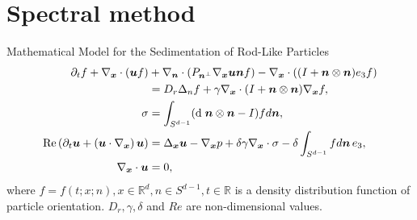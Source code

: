 \section{Spectral method}
\begin{frame}{Mathematical Model for the Sedimentation of Rod-Like Particles \cite{zbMATH06724175}}
	\scriptsize
	\begin{align*}
		\partial_t f+\nabla_{\boldsymbol{x}} \cdot(\boldsymbol{u} f) & +\nabla_{\boldsymbol{n}} \cdot\left(P_{\boldsymbol{n}^{\perp}} \nabla_{\boldsymbol{x}} \boldsymbol{u} \boldsymbol{n} f\right)-\nabla_{\boldsymbol{x}} \cdot\left((I+\boldsymbol{n} \otimes \boldsymbol{n}) e_3 f\right) \\
		& =D_r \Delta_n f+\gamma \nabla_{\boldsymbol{x}} \cdot(I+\boldsymbol{n} \otimes \boldsymbol{n}) \nabla_{\boldsymbol{x}} f, \notag \\
		\sigma & =\int_{S^{d-1}}(\text{d} \; \boldsymbol{n} \otimes \boldsymbol{n}-I) f d \boldsymbol{n},  \\
		\operatorname{Re}\left(\partial_t \boldsymbol{u}+\left(\boldsymbol{u} \cdot \nabla_{\boldsymbol{x}}\right) \boldsymbol{u}\right) & =\Delta_{\boldsymbol{x}} \boldsymbol{u}-\nabla_{\boldsymbol{x}} p+\delta \gamma \nabla_{\boldsymbol{x}} \cdot \sigma-\delta \int_{S^{d-1}} f d \boldsymbol{n} \, e_3, \\
		\nabla_{\boldsymbol{x}} \cdot \boldsymbol{u} & =0,
	\end{align*}
	where $f = f(t; x; n), x \in \mathbb{R}^d , n \in  S^{d-1}, t \in \mathbb{R}$ is a density distribution function of particle orientation. $D_r, \gamma, \delta$ and $Re$ are non-dimensional values.
\end{frame}


